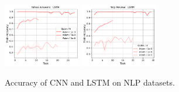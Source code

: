 \begin{figure}[htb!]
{    \includegraphics[width=0.3\textwidth]{figs/Accuracy/nlp/lstm/yahoo_answers_50.pdf}
    \includegraphics[width=0.3\textwidth]{figs/Accuracy/nlp/lstm/yelp_review_full_50.pdf}
    }
    \caption{Accuracy of CNN and LSTM on NLP datasets.}
    \label{fig:nlp_cnn_lstm}
\end{figure}

